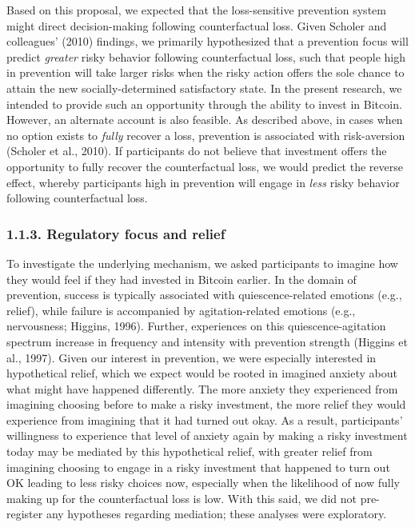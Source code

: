 \documentclass[man,floatsintext]{apa6}
\begin{document}
Based on this proposal, we expected that the loss-sensitive prevention system might direct decision-making following counterfactual loss. Given Scholer and colleagues' (2010) findings, we primarily hypothesized that a prevention focus will predict \emph{greater} risky behavior following counterfactual loss, such that people high in prevention will take larger risks when the risky action offers the sole chance to attain the new socially-determined satisfactory state. In the present research, we intended to provide such an opportunity through the ability to invest in Bitcoin. However, an alternate account is also feasible. As described above, in cases when no option exists to \emph{fully} recover a loss, prevention is associated with risk-aversion (Scholer et al., 2010). If participants do not believe that investment offers the opportunity to fully recover the counterfactual loss, we would predict the reverse effect, whereby participants high in prevention will engage in \emph{less} risky behavior following counterfactual loss.

\hypertarget{regulatory-focus-and-relief}{%
\subsubsection{1.1.3. Regulatory focus and relief}\label{regulatory-focus-and-relief}}

To investigate the underlying mechanism, we asked participants to imagine how they would feel if they had invested in Bitcoin earlier. In the domain of prevention, success is typically associated with quiescence-related emotions (e.g., relief), while failure is accompanied by agitation-related emotions (e.g., nervousness; Higgins, 1996). Further, experiences on this quiescence-agitation spectrum increase in frequency and intensity with prevention strength (Higgins et al., 1997). Given our interest in prevention, we were especially interested in hypothetical relief, which we expect would be rooted in imagined anxiety about what might have happened differently. The more anxiety they experienced from imagining choosing before to make a risky investment, the more relief they would experience from imagining that it had turned out okay. As a result, participants' willingness to experience that level of anxiety again by making a risky investment today may be mediated by this hypothetical relief, with greater relief from imagining choosing to engage in a risky investment that happened to turn out OK leading to less risky choices now, especially when the likelihood of now fully making up for the counterfactual loss is low. With this said, we did not pre-register any hypotheses regarding mediation; these analyses were exploratory.
\end{document}
